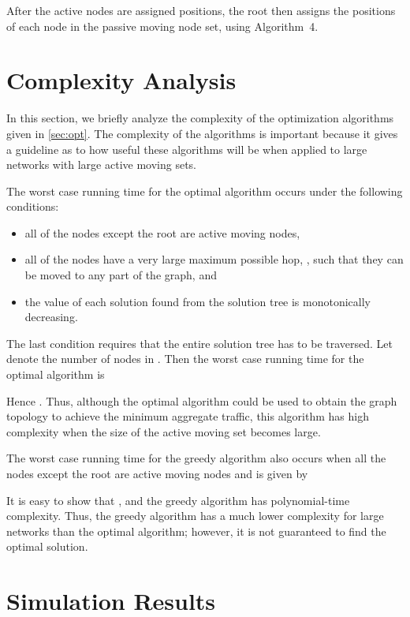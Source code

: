 \documentclass[10pt,conference]{IEEEtran}
\begin{document}
After the active nodes are assigned positions, the root then assigns
the positions of each node in the passive moving node set, using
Algorithm~4.





\section{Complexity Analysis}
\label{sec:complex}

In this section, we briefly analyze the complexity of the optimization
algorithms given in \autoref{sec:opt}.  The complexity of the algorithms
is important because it gives a guideline as to how useful these
algorithms will be when applied to large networks with large active
moving sets.

The worst case running time for the optimal algorithm occurs under the
following conditions:
\begin{itemize}
\item all of the nodes except the root are active moving nodes,
\item all of the nodes have a very large maximum possible hop,
  , such that they can be moved to any part of the graph, and
\item the value of each solution found from the solution tree is
  monotonically decreasing.
\end{itemize}
The last condition requires that the entire solution tree has to be
traversed.  Let  denote the number of nodes in .
Then the worst case running time for the optimal algorithm is

Hence .  Thus, although the optimal
algorithm could be used to obtain the graph topology to
achieve the minimum aggregate traffic, this algorithm
has high complexity when the size of the active moving set becomes large.

The worst case running time for the greedy algorithm also occurs when all the
nodes except the root are active moving nodes  and is given by

It is easy to show that , and the greedy algorithm has
polynomial-time complexity.  Thus, the greedy algorithm has a much
lower complexity for large networks than the optimal algorithm;
however, it is not guaranteed to find the optimal solution.




\section{Simulation Results}
\label{sec:sim_result}
\end{document}
